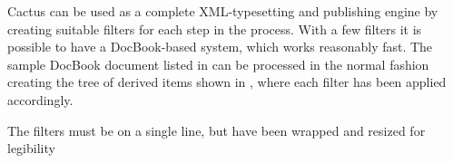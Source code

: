 



      

Cactus can be used as a complete XML-typesetting and publishing engine
by creating suitable filters for each step in the process.  With a few
filters it is possible to have a DocBook-based system, which works
reasonably fast.  The sample DocBook document listed in
 can be processed in the normal fashion
creating the tree of derived items shown in
, where each filter has been applied accordingly.

The filters must be on a single line, but have been wrapped and resized for legibility
